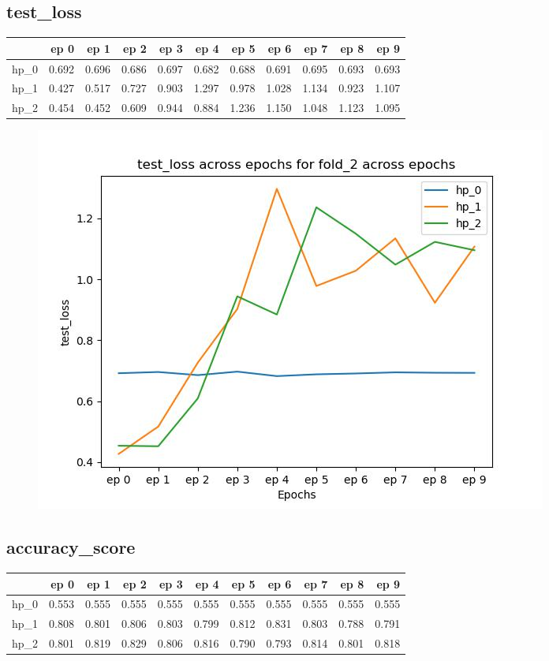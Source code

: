 \documentclass{article}
\begin{document}
\subsection{test\_loss}
\begin{tabular}{lrrrrrrrrrr}
\toprule
{} &   ep 0 &   ep 1 &   ep 2 &   ep 3 &   ep 4 &   ep 5 &   ep 6 &   ep 7 &   ep 8 &   ep 9 \\
\midrule
hp\_0 &  0.692 &  0.696 &  0.686 &  0.697 &  0.682 &  0.688 &  0.691 &  0.695 &  0.693 &  0.693 \\
hp\_1 &  0.427 &  0.517 &  0.727 &  0.903 &  1.297 &  0.978 &  1.028 &  1.134 &  0.923 &  1.107 \\
hp\_2 &  0.454 &  0.452 &  0.609 &  0.944 &  0.884 &  1.236 &  1.150 &  1.048 &  1.123 &  1.095 \\
\bottomrule
\end{tabular}

\begin{figure}[H]
\includegraphics[scale = 0.75]{fold_2/test_loss}
\end{figure}
\subsection{accuracy\_score}
\begin{tabular}{lrrrrrrrrrr}
\toprule
{} &   ep 0 &   ep 1 &   ep 2 &   ep 3 &   ep 4 &   ep 5 &   ep 6 &   ep 7 &   ep 8 &   ep 9 \\
\midrule
hp\_0 &  0.553 &  0.555 &  0.555 &  0.555 &  0.555 &  0.555 &  0.555 &  0.555 &  0.555 &  0.555 \\
hp\_1 &  0.808 &  0.801 &  0.806 &  0.803 &  0.799 &  0.812 &  0.831 &  0.803 &  0.788 &  0.791 \\
hp\_2 &  0.801 &  0.819 &  0.829 &  0.806 &  0.816 &  0.790 &  0.793 &  0.814 &  0.801 &  0.818 \\
\bottomrule
\end{tabular}
\end{document}
